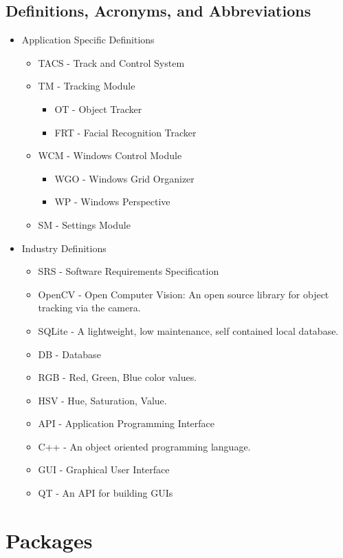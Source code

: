 \documentclass[titlepage]{article}
\begin{document}
\subsection{Definitions, Acronyms, and Abbreviations}
\begin{itemize}
	\item Application Specific Definitions
	\begin{itemize}
		\item TACS - Track and Control System
		\item TM - Tracking Module
		\begin{itemize}
			\item OT - Object Tracker
			\item FRT - Facial Recognition Tracker
		\end{itemize}
		\item WCM - Windows Control Module
		\begin{itemize}
			\item WGO - Windows Grid Organizer
			\item WP - Windows Perspective
		\end{itemize}
		\item SM - Settings Module
	\end{itemize}
	\item Industry Definitions
	\begin{itemize}
		\item SRS - Software Requirements Specification
		\item OpenCV - Open Computer Vision: An open source library for object tracking via the camera.
		\item SQLite - A lightweight, low maintenance, self contained local database.
		\item DB - Database
		\item RGB - Red, Green, Blue color values.
		\item HSV - Hue, Saturation, Value.
		\item API - Application Programming Interface
		\item C++ - An object oriented programming language.
		\item GUI - Graphical User Interface
		\item QT - An API for building GUIs
	\end{itemize}
\end{itemize}


\section{Packages}
\end{document}

